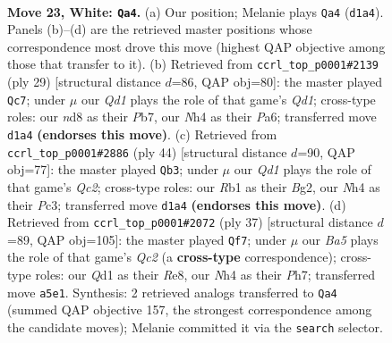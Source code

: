\documentclass[11pt]{article}
\begin{document}
\clearpage

\begin{figure}[p]\centering
\begin{subfigure}{0.46\textwidth}\centering
\resizebox{\linewidth}{!}{%
\newchessgame
\chessboard[
  setfen={1rbn1k2/1ppp1ppp/p2q4/B2Pr3/4n2N/4P1P1/PP2RP1P/1R1Q1BK1 w - - 21 23},
  showmover=false,
  pgfstyle=straightmove, color=movearrow, markmove={d1-a4}
]}
\caption{}
\end{subfigure}\hfill
\begin{subfigure}{0.46\textwidth}\centering
\resizebox{\linewidth}{!}{%
\newchessgame
\chessboard[
  setfen={r1bq1rk1/1p3pp1/p4n1p/2bpNP2/8/2N2Q2/PPP3PP/1K1R1B1R b - - 2 15},
  showmover=false,
  pgfstyle=straightmove, color=movearrow, markmove={d8-c7}
]}
\caption{}
\end{subfigure}
\\[4pt]
\begin{subfigure}{0.46\textwidth}\centering
\resizebox{\linewidth}{!}{%
\newchessgame
\chessboard[
  setfen={1r1qr1k1/p4p2/1p1p2b1/2pP3p/P1n1PBpP/2P3P1/2Q2PB1/R3R1K1 w - - 0 23},
  showmover=false,
  pgfstyle=straightmove, color=movearrow, markmove={c2-b3}
]}
\caption{}
\end{subfigure}\hfill
\begin{subfigure}{0.46\textwidth}\centering
\resizebox{\linewidth}{!}{%
\newchessgame
\chessboard[
  setfen={3rrbk1/p1q3pp/2p2p2/P1pnp3/2N5/2PP2Q1/1P1B1PPP/R3R1K1 b - - 2 19},
  showmover=false,
  pgfstyle=straightmove, color=movearrow, markmove={c7-f7}
]}
\caption{}
\end{subfigure}
\caption{\textbf{Move 23, White: \texttt{Qa4}.} (a) Our position; Melanie plays \texttt{Qa4} (\texttt{d1a4}). Panels (b)--(d) are the retrieved master positions whose correspondence most drove this move (highest QAP objective among those that transfer to it). (b) Retrieved from \texttt{ccrl\_top\_p0001\#2139} (ply 29) [structural distance $d$=86, QAP obj=80]: the master played \texttt{Qc7}; under $\mu$ our \emph{Qd1} plays the role of that game's \emph{Qd1}; cross-type roles: our \emph{n}d8 as their \emph{P}b7, our \emph{N}h4 as their \emph{P}a6; transferred move \texttt{d1a4} \textbf{(endorses this move)}. (c) Retrieved from \texttt{ccrl\_top\_p0001\#2886} (ply 44) [structural distance $d$=90, QAP obj=77]: the master played \texttt{Qb3}; under $\mu$ our \emph{Qd1} plays the role of that game's \emph{Qc2}; cross-type roles: our \emph{R}b1 as their \emph{B}g2, our \emph{N}h4 as their \emph{P}c3; transferred move \texttt{d1a4} \textbf{(endorses this move)}. (d) Retrieved from \texttt{ccrl\_top\_p0001\#2072} (ply 37) [structural distance $d$=89, QAP obj=105]: the master played \texttt{Qf7}; under $\mu$ our \emph{Ba5} plays the role of that game's \emph{Qc2} (a \textbf{cross-type} correspondence); cross-type roles: our \emph{Q}d1 as their \emph{R}e8, our \emph{N}h4 as their \emph{P}h7; transferred move \texttt{a5e1}. Synthesis: 2 retrieved analogs transferred to \texttt{Qa4} (summed QAP objective 157, the strongest correspondence among the candidate moves); Melanie committed it via the \texttt{search} selector.}
\label{fig:thought-m44}
\end{figure}
\end{document}
